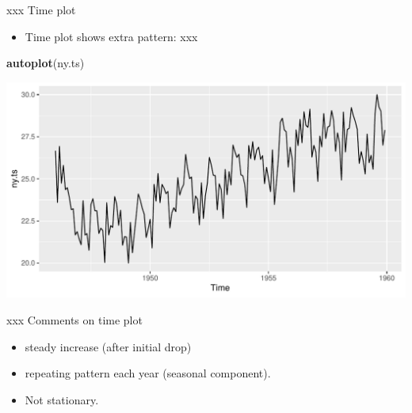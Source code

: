 \documentclass[ignorenonframetext,]{beamer}
\newenvironment{Shaded}{\begin{snugshade}}{\end{snugshade}}
\newcommand{\KeywordTok}[1]{\textcolor[rgb]{0.13,0.29,0.53}{\textbf{#1}}}
\newcommand{\NormalTok}[1]{#1}
\providecommand{\tightlist}{%
  \setlength{\itemsep}{0pt}\setlength{\parskip}{0pt}}
\begin{document}
\begin{frame}[fragile]{xxx Time plot}
\protect\hypertarget{xxx-time-plot}{}

\begin{itemize}
\tightlist
\item
  Time plot shows extra pattern: xxx
\end{itemize}

\begin{Shaded}
\begin{Highlighting}[]
\KeywordTok{autoplot}\NormalTok{(ny.ts)}
\end{Highlighting}
\end{Shaded}

\includegraphics{figure/unnamed-chunk-20-1.pdf}

\end{frame}

\begin{frame}{xxx Comments on time plot}
\protect\hypertarget{xxx-comments-on-time-plot}{}

\begin{itemize}
\tightlist
\item
  steady increase (after initial drop)
\item
  repeating pattern each year (seasonal component).
\item
  Not stationary.
\end{itemize}

\end{frame}
\end{document}
